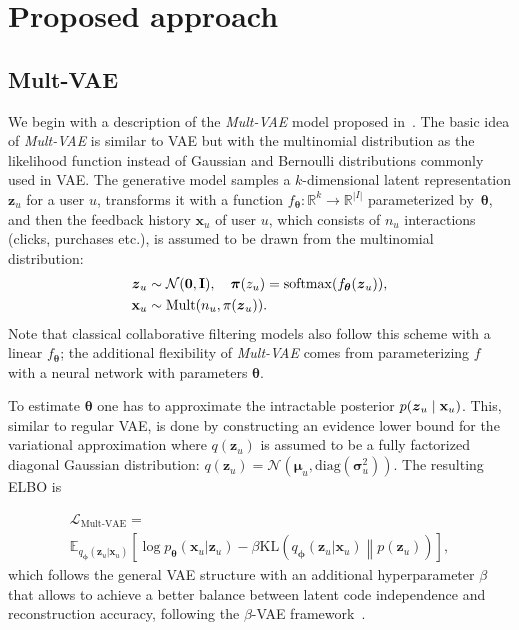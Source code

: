 \documentclass[sigconf,authorversion]{acmart}
\newcommand{\KL}[2]{\mathrm{KL}\left(#1 \middle\| #2\right)}
\def\x{{\bf x}}
\def\bZero{{\bf 0}}
\def\RR{{\bf R}}
\def\bz{{\bf z}}
\def\bI{{\bf I}}
\def\N{{\mathcal N}}
\def\Mult{\mathrm{Mult}}
\def\RR{{\mathbb R}}
\def\btheta{{\boldsymbol{\theta}}}
\def\bmu{{\boldsymbol{\mu}}}
\def\bsigma{{\boldsymbol{\sigma}}}
\def\bphi{{\boldsymbol{\phi}}}
\def\bpi{{\boldsymbol{\pi}}}
\def\bz{\boldsymbol{z}}
\def\bx{\boldsymbol{x}}
\begin{document}
\section{Proposed approach}\label{sec:method}

\subsection{Mult-VAE}\label{sec:mult}

We begin with a description of the \emph{Mult-VAE} model proposed in~\cite{liang2018variational}. The basic idea of \emph{Mult-VAE} is similar to VAE but with the multinomial distribution as the likelihood function instead of Gaussian and Bernoulli distributions commonly used in VAE. The generative model samples a $k$-dimensional latent representation $\bz_u$ for a user $u$, transforms it with a function $f_{\btheta}:\RR^k\to\RR^{|I|}$ parameterized by~$\btheta$, and then the feedback history $\bx_u$ of user $u$, which consists of $n_u$ interactions (clicks, purchases etc.), is assumed to be drawn from the multinomial distribution:
\begin{align}\label{eq:gen_multvae}
\bz_u &\sim \N(\bZero,\bI),\quad
\bpi(z_u) =\mathrm{softmax}(f_{\btheta}(\bz_u)),\\
\x_u &\sim \Mult(n_u,\pi(\bz_u)).
\end{align}
Note that classical collaborative filtering models also follow this scheme with a linear $f_{\btheta}$; the additional flexibility of \emph{Mult-VAE} comes from parameterizing $f$ with a neural network with parameters $\btheta$.

To estimate $\btheta$ one has to approximate the intractable posterior $p(\bz_u\mid\x_u)$. This, similar to regular VAE, is done by constructing an evidence lower bound for the variational approximation where $q(\bz_u)$ is assumed to be a fully factorized diagonal Gaussian distribution: $q(\bz_u) = \N\left(\bmu_u,\mathrm{diag}(\bsigma_u^2)\right)$. The resulting ELBO is

\begin{multline}\label{eq:elbo_multivae}
    \mathcal{L}_{\mathrm{Mult\text{-}VAE}} = \\ 
    \mathbb{E}_{q_{\bphi}(\bz_u|\bx_u)}
\left[
    \log p_{\btheta}(\bx_u|\bz_u) - \beta \KL{q_{\bphi}(\bz_u|\bx_u)}{p(\bz_u)}\right],
\end{multline}
which follows the general VAE structure with an additional hyperparameter $\beta$ that allows to achieve a better balance between latent code independence and reconstruction accuracy, following the $\beta$-VAE framework~\cite{Higgins2017betaVAELB}.
\end{document}
